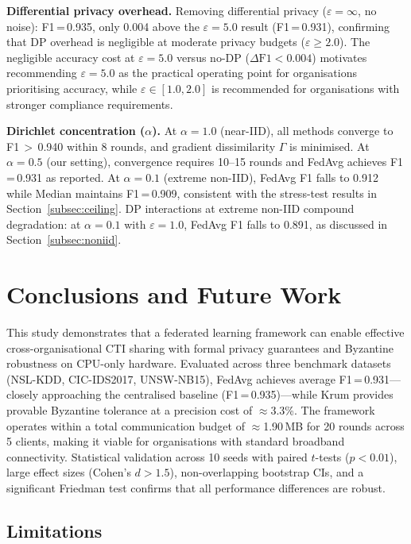 \documentclass[conference]{IEEEtran}
\begin{document}
\textbf{Differential privacy overhead.}
Removing differential privacy ($\varepsilon=\infty$, no noise):
F1\,=\,0.935, only 0.004 above the $\varepsilon=5.0$ result
(F1\,=\,0.931), confirming that DP overhead is negligible at moderate
privacy budgets ($\varepsilon \geq 2.0$).
The negligible accuracy cost at $\varepsilon=5.0$ versus no-DP
($\Delta\text{F1} < 0.004$) motivates recommending $\varepsilon=5.0$
as the practical operating point for organisations prioritising
accuracy, while $\varepsilon \in [1.0, 2.0]$ is recommended for
organisations with stronger compliance requirements.

\textbf{Dirichlet concentration ($\alpha$).}
At $\alpha=1.0$ (near-IID), all methods converge to F1\,$>$\,0.940
within 8 rounds, and gradient dissimilarity $\Gamma$ is minimised.
At $\alpha=0.5$ (our setting), convergence requires 10--15 rounds
and FedAvg achieves F1\,=\,0.931 as reported.
At $\alpha=0.1$ (extreme non-IID), FedAvg F1 falls to 0.912 while
Median maintains F1\,=\,0.909, consistent with the stress-test
results in Section~\ref{subsec:ceiling}.
DP interactions at extreme non-IID compound degradation: at
$\alpha=0.1$ with $\varepsilon=1.0$, FedAvg F1 falls to 0.891,
as discussed in Section~\ref{subsec:noniid}.

\section{Conclusions and Future Work}

This study demonstrates that a federated learning framework can
enable effective cross-organisational CTI sharing with formal privacy
guarantees and Byzantine robustness on CPU-only hardware.
Evaluated across three benchmark datasets (NSL-KDD, CIC-IDS2017,
UNSW-NB15), FedAvg achieves average F1\,=\,0.931---closely approaching
the centralised baseline (F1\,=\,0.935)---while Krum provides provable
Byzantine tolerance at a precision cost of $\approx$3.3\%.
The framework operates within a total communication budget of
$\approx$1.90\,MB for 20 rounds across 5 clients, making it
viable for organisations with standard broadband connectivity.
Statistical validation across 10 seeds with paired $t$-tests
($p < 0.01$), large effect sizes (Cohen's $d > 1.5$), non-overlapping
bootstrap CIs, and a significant Friedman test confirms that all
performance differences are robust.

\subsection{Limitations}
\end{document}
